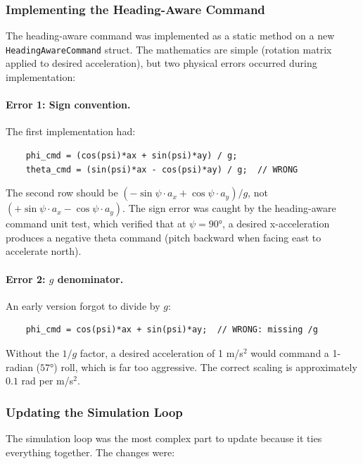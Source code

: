 \documentclass[12pt, a4paper]{article}
\begin{document}
\subsubsection{Implementing the Heading-Aware Command}

The heading-aware command was implemented as a static method on a new \texttt{HeadingAwareCommand} struct.  The mathematics are simple (rotation matrix applied to desired acceleration), but two physical errors occurred during implementation:

\paragraph{Error 1: Sign convention.}  The first implementation had:
\begin{verbatim}
    phi_cmd = (cos(psi)*ax + sin(psi)*ay) / g;
    theta_cmd = (sin(psi)*ax - cos(psi)*ay) / g;  // WRONG
\end{verbatim}
The second row should be $(-\sin\psi \cdot a_x + \cos\psi \cdot a_y) / g$, not $(+\sin\psi \cdot a_x - \cos\psi \cdot a_y)$.  The sign error was caught by the heading-aware command unit test, which verified that at $\psi = 90°$, a desired x-acceleration produces a negative theta command (pitch backward when facing east to accelerate north).

\paragraph{Error 2: $g$ denominator.}  An early version forgot to divide by $g$:
\begin{verbatim}
    phi_cmd = cos(psi)*ax + sin(psi)*ay;  // WRONG: missing /g
\end{verbatim}
Without the $1/g$ factor, a desired acceleration of 1 m/s$^2$ would command a 1-radian ($57°$) roll, which is far too aggressive.  The correct scaling is approximately $0.1$ rad per m/s$^2$.

\subsubsection{Updating the Simulation Loop}

The simulation loop was the most complex part to update because it ties everything together.  The changes were:
\end{document}
